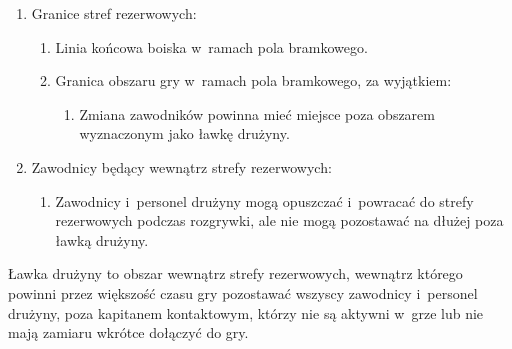 \documentclass[12pt,a4paper]{article}
\renewcommand{\paragraph}[1]{
  \oldparagraph{#1}%
  \leftskip2cm
}
\begin{document}
\begin{enumerate}
	\item Granice stref rezerwowych:
	      \begin{enumerate}
		      \item Linia końcowa boiska w~ramach pola bramkowego.

		      \item Granica obszaru gry w~ramach pola bramkowego, za wyjątkiem:
		            \begin{enumerate}
			            \item Zmiana zawodników powinna mieć miejsce poza obszarem wyznaczonym jako
			                  ławkę drużyny.
		            \end{enumerate}
	      \end{enumerate}

	\item Zawodnicy będący wewnątrz strefy rezerwowych:
	      \begin{enumerate}
		      \item Zawodnicy i~personel drużyny mogą opuszczać i~powracać do strefy
		            rezerwowych podczas rozgrywki, ale nie mogą pozostawać na dłużej poza
		            ławką drużyny.
	      \end{enumerate}
\end{enumerate}

\paragraph{Ławki drużyn}
Ławka drużyny to obszar wewnątrz strefy
rezerwowych, wewnątrz którego powinni przez większość czasu gry
pozostawać wszyscy zawodnicy i~personel drużyny, poza kapitanem
kontaktowym, którzy nie są aktywni w~grze lub nie mają zamiaru wkrótce
dołączyć do gry.
\end{document}
